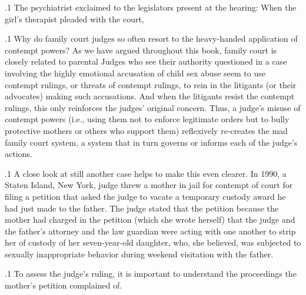 \documentclass[11pt, twoside]{article}
\begin{document}
{\p.1{%
The psychiatrist exclaimed to the legislators present at the hearing:
 When the girl’s therapist pleaded
with the court, 
}%

\p.1{%
Why do family court judges so often resort to the heavy-handed application of contempt powers? As we have argued throughout this book,
family court  is closely related to parental  Judges
who see their authority questioned in a case involving the highly emotional accusation of child sex abuse seem to use contempt rulings, or
threats of contempt rulings, to rein in the litigants (or their advocates)
making such accusations. And when the litigants resist the contempt
rulings, this only reinforces the judges’ original concern. Thus, a judge’s
misuse of contempt powers (i.e., using them not to enforce legitimate
orders but to bully protective mothers or others who support them) reflexively re-creates the mad family court system, a system that in turn
governs or informs each of the judge’s actions.
}%

\p.1{%
A close look at still another case helps to make this even clearer.
In 1990, a Staten Island, New York, judge threw a mother in jail for
contempt of court for filing a petition that asked the judge to vacate
a temporary custody award he had just made to the father. The judge
stated that the petition  because the
mother had charged in the petition (which she wrote herself)
that the judge and the father’s attorney and the law guardian were acting
 with one another to strip her of custody of her
seven-year-old daughter, who, she believed, was subjected to sexually inappropriate
behavior during weekend visitation with the father.
}%

\p.1{%
To assess the judge’s ruling, it is important to understand the proceedings the mother’s petition complained of.
}%

}
\end{document}
